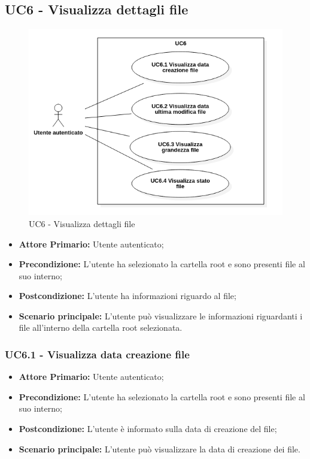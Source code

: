 \subsection{UC6 - Visualizza dettagli file}
\begin{figure}[H]
    \centering
    \includegraphics[scale = 0.6]{components/img/UC6.png}
    \caption{UC6 - Visualizza dettagli file}
\end{figure}
\begin{itemize}
\item \textbf{Attore Primario:} Utente autenticato;
\item \textbf{Precondizione:} L'utente ha selezionato la cartella root e sono presenti file al suo interno;
\item \textbf{Postcondizione:} L'utente ha informazioni riguardo al file;
\item \textbf{Scenario principale:} L'utente può visualizzare le informazioni riguardanti i file all'interno della cartella root selezionata.
\end{itemize}

\subsubsection{UC6.1 - Visualizza data creazione file}
\begin{itemize}
\item \textbf{Attore Primario:} Utente autenticato;
\item \textbf{Precondizione:} L'utente ha selezionato la cartella root e sono presenti file al suo interno;
\item \textbf{Postcondizione:} L'utente è informato sulla data di creazione del file;
\item \textbf{Scenario principale:} L'utente può visualizzare la data di creazione dei file.
\end{itemize}


